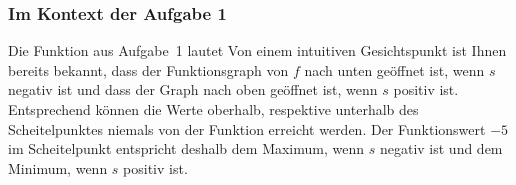 \documentclass[12pt]{article}
\begin{document}
\subsubsection{Im Kontext der Aufgabe 1}
Die Funktion aus Aufgabe~1 lautet 
Von einem intuitiven Gesichtspunkt ist Ihnen bereits bekannt, dass der Funktionsgraph von $f$ nach unten geöffnet ist, wenn $s$ negativ ist und dass der Graph nach oben geöffnet ist, wenn $s$ positiv ist. Entsprechend können die Werte oberhalb, respektive unterhalb des Scheitelpunktes niemals von der Funktion erreicht werden. Der Funktionswert $-5$ im Scheitelpunkt entspricht deshalb dem Maximum, wenn $s$ negativ ist und dem Minimum, wenn $s$ positiv ist.
\begin{center}
\begin{minipage}{0.45\textwidth}%
\end{minipage}
\hfill
\vrule
\hfill
\begin{minipage}{0.45\textwidth}%
\end{minipage}
\end{center}
\end{document}
